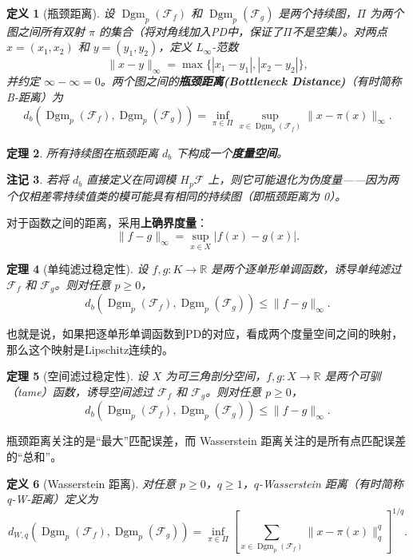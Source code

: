 \documentclass[UTF8]{ctexart}
\newtheorem{definition}{定义}[section]
\newtheorem{remark}[definition]{注记}
\newtheorem{theorem}[definition]{定理}
\begin{document}
\begin{definition}[瓶颈距离]
\label{def:bottleneck-distance}
设 \(\operatorname{Dgm}_p(\mathcal{F}_f)\) 和 \(\operatorname{Dgm}_p(\mathcal{F}_g)\) 是两个持续图，\(\Pi\) 为两个图之间所有双射 \(\pi\) 的集合（将对角线加入PD中，保证了$\Pi$不是空集）。对两点 \(x=(x_1,x_2)\) 和 \(y=(y_1,y_2)\)，定义 \(L_\infty\)-范数
\[
\|x - y\|_\infty = \max\{|x_1 - y_1|, |x_2 - y_2|\},
\]
并约定 \(\infty - \infty = 0\)。两个图之间的\textbf{瓶颈距离(Bottleneck Distance)}（有时简称B-距离）为
\[
d_b(\operatorname{Dgm}_p(\mathcal{F}_f), \operatorname{Dgm}_p(\mathcal{F}_g))
= \inf_{\pi \in \Pi} \sup_{x \in \operatorname{Dgm}_p(\mathcal{F}_f)} \|x - \pi(x)\|_\infty.
\]
\end{definition}

\begin{theorem}
\label{thm:bottleneck-metric}
所有持续图在瓶颈距离 \(d_b\) 下构成一个\textbf{度量空间}。
\end{theorem}

\begin{remark}
若将 \(d_b\) 直接定义在同调模 \(H_p\mathcal{F}\) 上，则它可能退化为伪度量——因为两个仅相差零持续值类的模可能具有相同的持续图（即瓶颈距离为 0）。
\end{remark}


对于函数之间的距离，采用\textbf{上确界度量}：
\[
\|f - g\|_\infty = \sup_{x \in X} |f(x) - g(x)|.
\]

\begin{theorem}[单纯滤过稳定性]
\label{thm:simplicial-stability}
设 \(f, g: K \to \mathbb{R}\) 是两个逐单形单调函数，诱导单纯滤过 \(\mathcal{F}_f\) 和 \(\mathcal{F}_g\)。则对任意 \(p \ge 0\)，
\[
d_b(\operatorname{Dgm}_p(\mathcal{F}_f), \operatorname{Dgm}_p(\mathcal{F}_g)) \le \|f - g\|_\infty.
\]
\end{theorem}
也就是说，如果把逐单形单调函数到PD的对应，看成两个度量空间之间的映射，那么这个映射是Lipschitz连续的。

\begin{theorem}[空间滤过稳定性]
\label{thm:space-stability}
设 \(X\) 为可三角剖分空间，\(f, g: X \to \mathbb{R}\) 是两个可驯（tame）函数，诱导空间滤过 \(\mathcal{F}_f\) 和 \(\mathcal{F}_g\)。则对任意 \(p \ge 0\)，
\[
d_b(\operatorname{Dgm}_p(\mathcal{F}_f), \operatorname{Dgm}_p(\mathcal{F}_g)) \le \|f - g\|_\infty.
\]
\end{theorem}

瓶颈距离关注的是“最大”匹配误差，而 Wasserstein 距离关注的是所有点匹配误差的“总和”。

\begin{definition}[Wasserstein 距离]
\label{def:wasserstein-distance}
对任意 \(p \ge 0\)，\(q \ge 1\)，\(q\)-Wasserstein 距离（有时简称q-W-距离）定义为
\[
d_{W,q}(\operatorname{Dgm}_p(\mathcal{F}_f), \operatorname{Dgm}_p(\mathcal{F}_g))
= \inf_{\pi \in \Pi} \left[ \sum_{x \in \operatorname{Dgm}_p(\mathcal{F}_f)} \|x - \pi(x)\|_q^q \right]^{1/q}.
\]
\end{definition}
\end{document}
